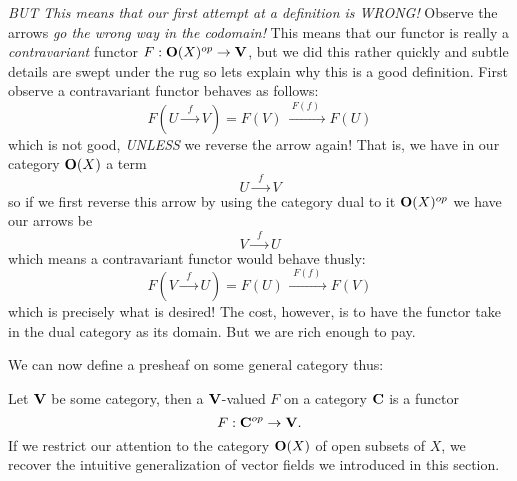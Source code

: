 \emph{BUT This means that our first attempt at a definition is WRONG!} 
Observe the arrows \emph{go the wrong way in the codomain!} This
means that our functor is really a \emph{contravariant} functor
$F:\mathbf{O}(X)^{op}\to\mathbf{V}$, but we did this rather quickly and
subtle details are swept under the rug so lets explain why this
is a good definition. First observe a contravariant functor
behaves as follows:
\begin{equation}%
F\left(U\xrightarrow{\;\;f\;\;}V\right) = F(V)\xrightarrow{\;\;F(f)\;\;}F(U)
\end{equation}
which is not good, \emph{UNLESS} we reverse the arrow again! That
is, we have in our category $\mathbf{O}(X)$ a term
\begin{equation*}%
U\xrightarrow{\;\;f\;\;}V
\end{equation*}
so if we first reverse this arrow by using the category dual to
it $\mathbf{O}(X)^{op}$ we have our arrows be
\begin{equation*}%
V\xrightarrow{\;\;f\;\;}U
\end{equation*}
which means a contravariant functor would behave thusly:
\begin{equation}%
F\left(V\xrightarrow{\;\;f\;\;}U\right) = F(U)\xrightarrow{\;\;F(f)\;\;}F(V)
\end{equation}
which is precisely what is desired! The cost, however, is to have
the functor take in the dual category as its domain. But we are
rich enough to pay.

We can now define a presheaf on some general category thus:
\begin{defn}\label{defn:presheaf}
Let $\mathbf{V}$ be some category, then a $\mathbf{V}$-valued
 $F$ on a category $\mathbf{C}$ is a functor
\begin{equation}%
F:\ms{C}^{op}\to\ms{V}.
\end{equation}
If we restrict our attention to the category $\mathbf{O}(X)$ of open
subsets of $X$, we recover the intuitive generalization of vector
fields we introduced in this section.
\end{defn}
\begin{comment}
\begin{rmk}
A presheaf with consistency on overlaps is precisely a sheaf. We
are uninterested in such things for several reasons. First, it
would be an insult to dedicated a few meager paragraphs to the
subject when it deserves a book in its own right. Second, we can
do a number of nifty things with presheaves in category theory,
which is all we care about at the moment.
\end{rmk}
\end{comment}

